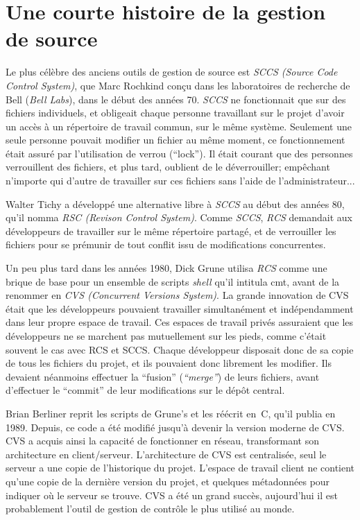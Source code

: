 \section{Une courte histoire de la gestion de source}

Le plus célèbre des anciens outils de gestion de source est \textit{SCCS
(Source Code Control System)}, que Marc Rochkind conçu dans les laboratoires de
recherche de Bell (\textit{Bell Labs}), dans le début des années 70.
\textit{SCCS} ne fonctionnait que sur des fichiers individuels, et obligeait chaque personne travaillant sur le projet d'avoir un accès à un répertoire de
travail commun, sur le même système. Seulement une seule personne pouvait
modifier un fichier au même moment, ce fonctionnement était assuré par
l'utilisation de verrou (``lock''). Il était courant que des personnes
verrouillent des fichiers, et plus tard, oublient de le déverrouiller;
empêchant n'importe qui d'autre de travailler sur ces fichiers sans l'aide de
l'administrateur...

Walter Tichy a développé une alternative libre à \textit{SCCS} au début des
années 80, qu'il nomma \textit{RSC (Revison Control System)}.  Comme
\textit{SCCS}, \textit{RCS} demandait aux développeurs de travailler sur le même
répertoire partagé, et de verrouiller les
fichiers pour se prémunir de tout conflit issu de modifications concurrentes.

Un peu plus tard dans les années 1980, Dick Grune utilisa \textit{RCS} comme
une brique de base pour un ensemble de scripts \textit{shell} qu'il intitula
cmt, avant de la renommer en \textit{CVS (Concurrent Versions System)}.  La
grande innovation de CVS était que les développeurs pouvaient travailler
simultanément et indépendamment dans leur propre espace de travail. Ces espaces
de travail privés assuraient que les développeurs ne se marchent pas
mutuellement sur les pieds, comme c'était souvent le cas avec RCS et SCCS.
Chaque développeur disposait donc de sa copie de tous les fichiers du projet,
et ils pouvaient donc librement les modifier. Ils devaient néanmoins effectuer
la ``fusion'' (\textit{``merge''}) de leurs fichiers, avant d'effectuer le
``commit'' de leur modifications sur le dépôt central.

Brian Berliner reprit les scripts de Grune's et les réécrit en~C, qu'il publia
en 1989. Depuis, ce code a été modifié jusqu'à devenir la version moderne de
CVS. CVS a acquis ainsi la capacité de fonctionner en réseau, transformant son
architecture en client/serveur. L'architecture de CVS est centralisée, seul le
serveur a une copie de l'historique du projet. L'espace de travail client ne
contient qu'une copie de la dernière version du projet, et quelques métadonnées
pour indiquer où le serveur se trouve. CVS a été un grand succès, aujourd'hui
il est probablement l'outil de gestion de contrôle le plus utilisé au monde. 

